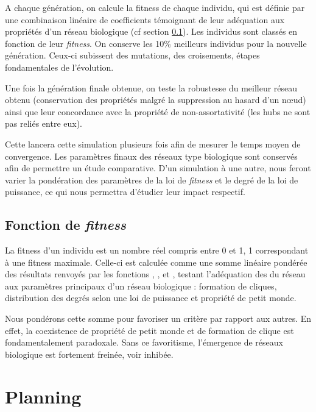 A chaque génération, on calcule la fitness de chaque individu, qui est définie par une combinaison linéaire de coefficients témoignant de leur adéquation aux propriétés d'un réseau biologique (cf section \ref{fitness}).
Les individus sont classés en fonction de leur \textit{fitness}. On conserve les 10\% meilleurs individus pour la nouvelle génération. Ceux-ci subissent des mutations, des croisements, étapes fondamentales de l'évolution.

Une fois la génération finale obtenue, on teste la robustesse du meilleur réseau obtenu (conservation des propriétés malgré la suppression au hasard d'un nœud) ainsi que leur concordance avec la propriété de non-assortativité (les hubs ne sont pas reliés entre eux).

Cette lancera cette simulation plusieurs fois afin de mesurer le temps moyen de convergence.
Les paramètres finaux des réseaux type \og biologique \fg sont conservés afin de permettre un étude comparative. D'un simulation à une autre, nous feront varier la pondération des paramètres de la loi de \textit{fitness} et le degré de la loi de puissance, ce qui nous permettra d'étudier leur impact respectif.

\subsection{Fonction de \textit{fitness} }
\label{fitness}
La fitness d'un individu est un nombre réel compris entre 0 et 1, 1 correspondant à une fitness maximale.
Celle-ci est calculée comme une somme linéaire pondérée des résultats renvoyés par les fonctions \texttt{}, \texttt{}, et \texttt{}, testant l'adéquation des du réseau aux paramètres principaux d'un réseau biologique : formation de cliques, distribution des degrés selon une loi de puissance et propriété de petit monde.

\medskip
Nous pondérons cette somme pour favoriser un critère par rapport aux autres. En effet, la coexistence de propriété de petit monde et de formation de clique est fondamentalement paradoxale. Sans ce favoritisme, l'émergence de réseaux biologique est fortement freinée, voir inhibée.


\section{Planning}

